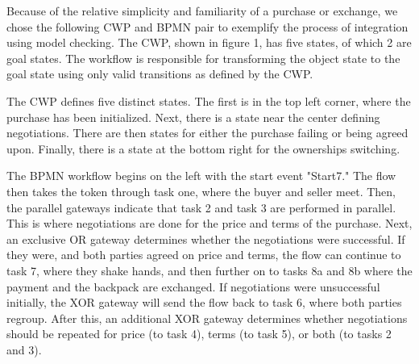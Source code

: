 Because of the relative simplicity and familiarity of a purchase or exchange, we chose the following CWP and BPMN pair to exemplify the process of integration using model checking. The CWP, shown in figure 1, has five states, of which 2 are goal states. The workflow is responsible for transforming the object state to the goal state using only valid transitions as defined by the CWP.

The CWP defines five distinct states. The first is in the top left corner, where the purchase has been initialized. Next, there is a state near the center defining negotiations. There are then states for either the purchase failing or being agreed upon. Finally, there is a state at the bottom right for the ownerships switching.

The BPMN workflow begins on the left with the start event "Start7." The flow then takes the token through task one, where the buyer and seller meet. Then, the parallel gateways indicate that task 2 and task 3 are performed in parallel. This is where negotiations are done for the price and terms of the purchase. Next, an exclusive OR gateway determines whether the negotiations were successful. If they were, and both parties agreed on price and terms, the flow can continue to task 7, where they shake hands, and then further on to tasks 8a and 8b where the payment and the backpack are exchanged. If negotiations were unsuccessful initially, the XOR gateway will send the flow back to task 6, where both parties regroup. After this, an additional XOR gateway determines whether negotiations should be repeated for price (to task 4), terms (to task 5), or both (to tasks 2 and 3).

